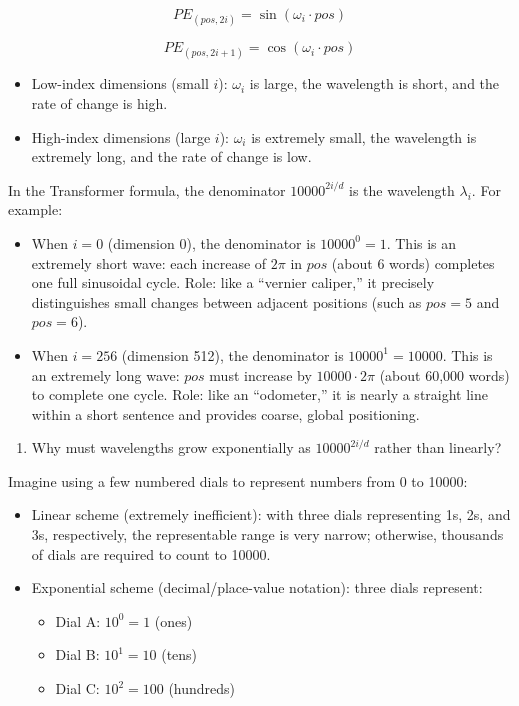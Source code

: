 \[
PE_{(pos,2i)}=\sin(\omega_i\cdot pos)
\]

\[
PE_{(pos,2i+1)}=\cos(\omega_i\cdot pos)
\]

\begin{itemize}
\tightlist
\item
  Low-index dimensions (small \(i\)): \(\omega_i\) is large, the wavelength is short, and the rate of change is high.
\item
  High-index dimensions (large \(i\)): \(\omega_i\) is extremely small, the wavelength is extremely long, and the rate of change is low.
\end{itemize}

In the Transformer formula, the denominator \(10000^{2i/d}\) is the wavelength \(\lambda_i\). For example:

\begin{itemize}
\tightlist
\item
  When \(i=0\) (dimension 0), the denominator is \(10000^0=1\). This is an extremely short wave: each increase of \(2\pi\) in \(pos\) (about 6 words) completes one full sinusoidal cycle. Role: like a ``vernier caliper,'' it precisely distinguishes small changes between adjacent positions (such as \(pos=5\) and \(pos=6\)).
\item
  When \(i=256\) (dimension 512), the denominator is \(10000^1=10000\). This is an extremely long wave: \(pos\) must increase by \(10000\cdot2\pi\) (about 60,000 words) to complete one cycle. Role: like an ``odometer,'' it is nearly a straight line within a short sentence and provides coarse, global positioning.
\end{itemize}

\begin{enumerate}
\def\labelenumi{\arabic{enumi}.}
\setcounter{enumi}{2}
\tightlist
\item
  Why must wavelengths grow exponentially as \(10000^{2i/d}\) rather than linearly?
\end{enumerate}

Imagine using a few numbered dials to represent numbers from 0 to 10000:

\begin{itemize}
\tightlist
\item
  Linear scheme (extremely inefficient): with three dials representing 1s, 2s, and 3s, respectively, the representable range is very narrow; otherwise, thousands of dials are required to count to 10000.
\item
{}
  Exponential scheme (decimal/place-value notation): three dials represent:

  \begin{itemize}
  \tightlist
  \item
    Dial A: \(10^0=1\) (ones)
  \item
    Dial B: \(10^1=10\) (tens)
  \item
    Dial C: \(10^2=100\) (hundreds)
  \end{itemize}
\end{itemize}

